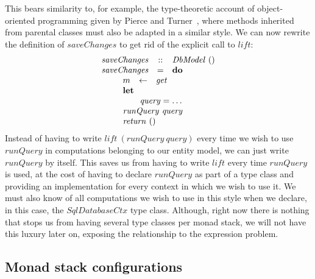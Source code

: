 This bears similarity to, for example, the type-theoretic account of object-oriented programming given by Pierce and Turner~\cite{pierce1994simple}, where methods inherited from parental classes must also be adapted in a similar style. We can now rewrite the definition of $\mathit{saveChanges}$ to get rid of the explicit call to $\mathit{lift}$:
\begin{displaymath}
\begin{array}{lcl}
\mathit{saveChanges} & :: & \mathit{DbModel}~() \\
\mathit{saveChanges} & = & \mathbf{do} \\
\multicolumn{3}{l}{\qquad \begin{array}{lcl}
    m & \leftarrow & \mathit{get} \\
    \multicolumn{3}{l}{\mathbf{let}} \\
    \multicolumn{3}{l}{\qquad \mathit{query} = \ldots} \\
    \multicolumn{3}{l}{\mathit{runQuery}~\mathit{query}}\\
    \multicolumn{3}{l}{\mathit{return}~()}
\end{array} }
\end{array}
\end{displaymath}
Instead of having to write $\mathit{lift}~(\mathit{runQuery}~\mathit{query})$ every time we wish to use $\mathit{runQuery}$ in computations belonging to our entity model, we can just write $\mathit{runQuery}$ by itself. This saves us from having to write $\mathit{lift}$ every time $\mathit{runQuery}$ is used, at the cost of having to declare $\mathit{runQuery}$ as part of a type class and providing an implementation for every context in which we wish to use it. We must also know of all computations we wish to use in this style when we declare, in this case, the $\mathit{SqlDatabaseCtx}$ type class. Although, right now there is nothing that stops us from having several type classes per monad stack, we will not have this luxury later on, exposing the relationship to the expression problem.

\subsection{Monad stack configurations}
\label{sec:configurations}

